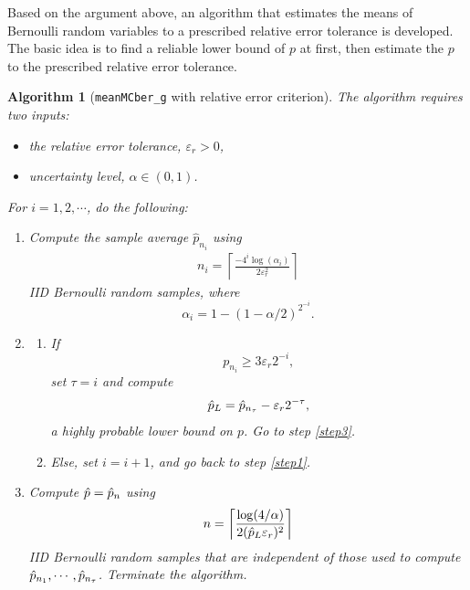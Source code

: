 \documentclass{iitthesis}
\newtheorem{algorithm}[theorem]{Algorithm}
\theoremstyle{definition}
\begin{document}
Based on the argument above, an algorithm that estimates the means of Bernoulli random variables to a prescribed relative error tolerance is developed. The basic idea is to find a reliable lower bound of $p$ at first, then estimate the $p$ to the prescribed relative error tolerance.
\begin{algorithm}[{\tt meanMCber\_g} with relative error criterion]\label{algrel}
The algorithm requires two inputs:
\begin{itemize}
\item the relative error tolerance, $\varepsilon_r > 0$, 
\item uncertainty level, $\alpha \in (0,1)$.
\end{itemize}
For $i = 1,2,\cdots$, do the following:
\begin{enumerate}
\item \label{step1} 
Compute the sample average $\hat{p}_{n_i}$ using 
\begin{align}\label{relalgni}
n_i = \left \lceil \frac{-4^i \log\left ( \alpha_i \right)}{2\varepsilon_r^2}\right \rceil
\end{align}
 IID Bernoulli random samples, where 
 \begin{equation}\label{alphaiBerRel}
 \alpha_i =1-(1-\alpha/2)^{2^{-i}}.
 \end{equation}
\item \label{step2}
\begin{enumerate}
\item If 
\begin{equation}\label{stoppingcriterionBerRel}
p_{n_i} \geq 3\varepsilon_r 2^{-i},
\end{equation} set $\tau=i$ and compute 
\begin{align}\label{def:hpl}
\hat{p}_L= \hat{p}_{n_\tau} - \varepsilon_r 2^{-\tau},
\end{align}
 a highly probable lower bound on $p$. Go to step \ref{step3}. 
\item Else, set $i = i+1$, and go back to step \ref{step1}.
\end{enumerate}
    \item \label{step3}
Compute $\hat{p} = \hat{p}_n$ using 
\begin{align}\label{reln}
n= \left \lceil \frac{\log (4/\alpha)}{2(\hat{p}_L\varepsilon_{r})^2} \right \rceil 
\end{align}
  IID Bernoulli random samples that are independent of those used to compute $\hat{p}_{n_1}, \cdots, \hat{p}_{n_\tau}$. Terminate the algorithm.
  \end{enumerate}
\end{algorithm}
\end{document}
